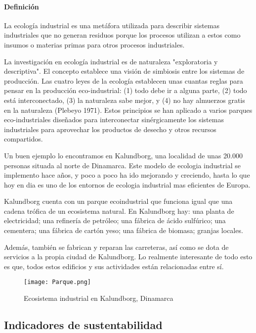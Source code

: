 \documentclass[runningheads]{llncs}
\begin{document}
\paragraph{Definición}La ecología industrial es una metáfora utilizada para describir sistemas industriales que no generan residuos porque los procesos utilizan a estos como insumos o materias primas para otros procesos industriales.

\bigskip   
La investigación en ecología industrial es de naturaleza "exploratoria y descriptiva". El concepto establece una visión de simbiosis entre los sistemas de producción. Las cuatro leyes de la ecología establecen unas cuantas reglas para pensar en la producción eco-industrial: (1) todo debe ir a alguna parte, (2) todo está interconectado, (3) la naturaleza sabe mejor, y (4) no hay almuerzos gratis en la naturaleza (Plebeyo 1971). Estos principios se han aplicado a varios parques eco-industriales diseñados para interconectar sinérgicamente los sistemas industriales para aprovechar los productos de desecho y otros recursos compartidos.

\bigskip
Un buen ejemplo lo encontramos en Kalundborg, una localidad de unas 20.000 personas situada al norte de Dinamarca. Este modelo de ecologia industrial se implemento hace años, y poco a poco ha ido mejorando y creciendo, hasta lo que hoy en dia es uno de los entornos de ecologia industrial mas eficientes de Europa.

\bigskip
Kalundborg cuenta con un parque ecoindustrial que funciona igual que una cadena trófica de un ecosistema natural.
En Kalundborg hay: una planta de electricidad; una refinería de petróleo; una fábrica de ácido sulfúrico; una cementera; una fábrica de cartón yeso; una fábrica de biomasa; granjas locales.

\bigskip
Además, también se fabrican y reparan las carreteras, así como se dota de servicios a la propia ciudad de Kalundborg. Lo realmente interesante de todo esto es que, todos estos edificios y sus actividades están relacionadas entre sí.

\begin{figure}[htbp] %
  \texttt{[image: Parque.png]}
 \caption{Ecosistema industrial en Kalundborg, Dinamarca }
 \label{Parque}
\end{figure}

\subsection{Indicadores de sustentabilidad}
\end{document}
